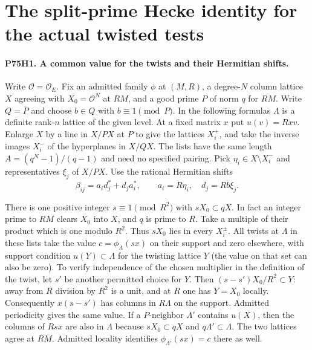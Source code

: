 \section{The split-prime Hecke identity for the actual twisted tests}

\paragraph{P75H1. A common value for the twists and their Hermitian shifts.}
Write $\mathcal O=\mathcal O_E$. Fix an admitted family $\phi$ at
$(M,R)$, a degree-$N$ column lattice $X$ agreeing with
$X_0=\mathcal O^N$ at $RM$, and a good prime $P$ of norm $q$
for $RM$. Write $Q=\bar P$ and choose $b\in Q$ with $b\equiv1\pmod P$.
In the following formulas $\Lambda$ is a definite rank-$n$ lattice of
the given level. At a fixed matrix $x$ put $u(v)=Rxv$.
Enlarge $X$ by a line in $X/PX$ at $P$ to give the lattices $X_i^+$,
and take the inverse images $X_i^-$ of the hyperplanes in $X/QX$.
The lists have the same length $A=(q^N-1)/(q-1)$ and need no
specified pairing. Pick $\eta_i\in X\setminus X_i^-$ and representatives
$\xi_j$ of $X/PX$. Use the rational Hermitian shifts
\[
 \beta_{ij}=a_i d_j^*+d_j a_i^*,\qquad
 a_i=R\eta_i,\quad d_j=Rb\xi_j .
\]

There is one positive integer $s\equiv1\pmod{R^2}$ with
$sX_0\subset qX$. In fact an integer prime to $RM$ clears $X_0$ into
$X$, and $q$ is prime to $R$. Take a multiple of their product
which is one modulo $R^2$. Thus $sX_0$ lies in every $X_i^\pm$.
All twists at $\Lambda$ in these lists take the value
$c=\phi_\Lambda(sx)$ on their support and zero elsewhere, with support
condition $u(Y)\subset\Lambda$ for the twisting lattice $Y$
(the value on that set can also be zero).
To verify independence of the chosen multiplier in the definition of
the twist, let $s'$ be another permitted choice for $Y$. Then
$(s-s')X_0/R^2\subset Y$: away from $R$ division by $R^2$ is a unit,
and at $R$ one has $Y=X_0$ locally. Consequently $x(s-s')$ has
columns in $R\Lambda$ on the support. Admitted periodicity gives
the same value. If a $P$-neighbor $\Lambda'$ contains $u(X)$,
then the columns of $R s x$ are also in $\Lambda$ because
$sX_0\subset qX$ and $q\Lambda'\subset\Lambda$.
The two lattices agree at $RM$. Admitted locality identifies
$\phi_{\Lambda'}(s x)=c$ there as well.

